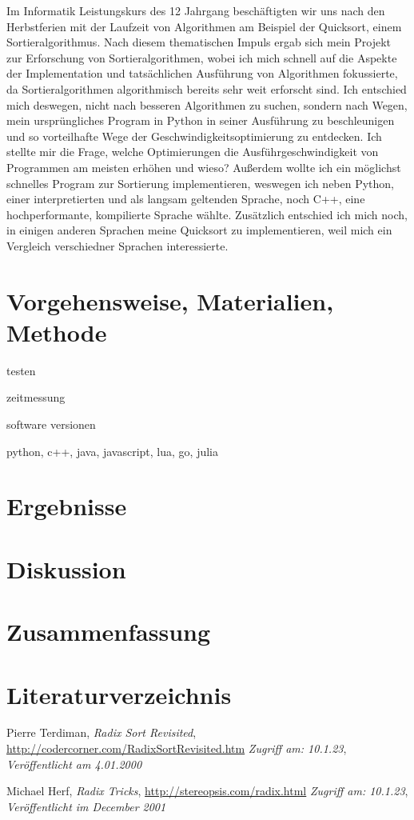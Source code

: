 \documentclass[12pt,a4paper]{article}
\begin{document}
Im Informatik Leistungskurs des 12 Jahrgang beschäftigten wir uns nach den Herbstferien mit
der Laufzeit von Algorithmen am Beispiel der Quicksort, einem Sortieralgorithmus. 
Nach diesem thematischen Impuls ergab sich mein Projekt zur Erforschung von Sortieralgorithmen, 
wobei ich mich schnell auf die Aspekte der Implementation und tatsächlichen Ausführung 
von Algorithmen fokussierte, da Sortieralgorithmen algorithmisch bereits sehr weit erforscht sind.
Ich entschied mich deswegen, nicht nach besseren Algorithmen zu suchen, sondern nach Wegen, 
mein ursprüngliches Program in Python in seiner Ausführung zu beschleunigen und so vorteilhafte
Wege der Geschwindigkeitsoptimierung zu entdecken.
Ich stellte mir die Frage, welche Optimierungen die Ausführgeschwindigkeit von Programmen
am meisten erhöhen und wieso?
Außerdem wollte ich ein möglichst schnelles Program zur Sortierung implementieren, weswegen ich
neben Python, einer interpretierten und als langsam geltenden Sprache, noch C++, 
eine hochperformante, kompilierte Sprache wählte.
Zusätzlich entschied ich mich noch, in einigen anderen Sprachen meine Quicksort zu implementieren,
weil mich ein Vergleich verschiedner Sprachen interessierte.

\clearpage
\section*{Vorgehensweise, Materialien, Methode}
\label{sec:methode}

testen

zeitmessung


software versionen

python, c++, java, javascript, lua, go, julia



\clearpage
\section*{Ergebnisse}
\clearpage
\section*{Diskussion}
\clearpage
\section*{Zusammenfassung}
\clearpage
\section*{Literaturverzeichnis}

\begin{thebibliography}{10}
        Pierre Terdiman,
        \textit{Radix Sort Revisited},
        \url{http://codercorner.com/RadixSortRevisited.htm}
        \textit{Zugriff am: 10.1.23},
        \textit{Veröffentlicht am 4.01.2000}
    
        Michael Herf,
        \textit{Radix Tricks},
        \url{http://stereopsis.com/radix.html}
        \textit{Zugriff am: 10.1.23},
        \textit{Veröffentlicht im December 2001}

\end{thebibliography}
\end{document}
